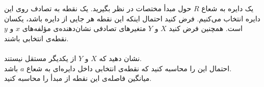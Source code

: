 \problem{}
یک دایره به شعاع \( R \) حول مبدأ مختصات در نظر بگیرید. یک نقطه به تصادف روی این دایره انتخاب می‌کنیم. 
فرض کنید احتمال اینکه این نقطه هر جایی از دایره باشد، یکسان است. همچنین فرض کنید 
\( X \) و \( Y \) متغیرهای تصادفی نشان‌دهنده‌ی مؤلفه‌های \( x \) و \( y \) نقطه‌ی انتخابی باشند. 
\\
\\
\subproblem{}
نشان دهید که \( X \) و \( Y \) از یکدیگر مستقل نیستند.
\\
\subproblem{}
احتمال این را محاسبه کنید که نقطه‌ی انتخابی داخل دایره‌ای به شعاع \( a \) باشد.
\\
\subproblem{}
میانگین فاصله‌ی این نقطه از مبدأ را محاسبه کنید.
